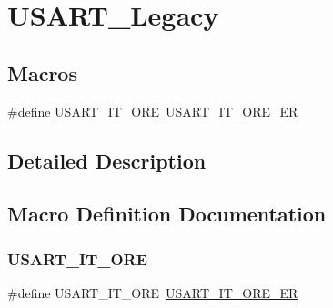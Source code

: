 \hypertarget{group___u_s_a_r_t___legacy}{}\section{U\+S\+A\+R\+T\+\_\+\+Legacy}
\label{group___u_s_a_r_t___legacy}
\subsection*{Macros}
\begin{DoxyCompactItemize}
\item 
\#define \mbox{\hyperlink{group___u_s_a_r_t___legacy_ga8b7d40e02a81be787fbb325bbe6dfbeb}{U\+S\+A\+R\+T\+\_\+\+I\+T\+\_\+\+O\+RE}}~\mbox{\hyperlink{group___u_s_a_r_t___interrupt__definition_ga1faa2d618b7c1038f8cad50fec7d0ba4}{U\+S\+A\+R\+T\+\_\+\+I\+T\+\_\+\+O\+R\+E\+\_\+\+ER}}
\end{DoxyCompactItemize}


\subsection{Detailed Description}


\subsection{Macro Definition Documentation}
\mbox{\label{group___u_s_a_r_t___legacy_ga8b7d40e02a81be787fbb325bbe6dfbeb}} 
\subsubsection{\texorpdfstring{USART\_IT\_ORE}{USART\_IT\_ORE}}
{\footnotesize\ttfamily \#define U\+S\+A\+R\+T\+\_\+\+I\+T\+\_\+\+O\+RE~\mbox{\hyperlink{group___u_s_a_r_t___interrupt__definition_ga1faa2d618b7c1038f8cad50fec7d0ba4}{U\+S\+A\+R\+T\+\_\+\+I\+T\+\_\+\+O\+R\+E\+\_\+\+ER}}}

